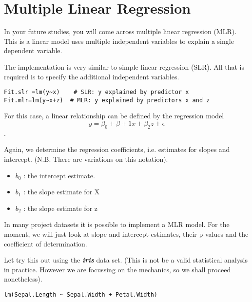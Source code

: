 \documentclass[a4paper,12pt]{article}
\begin{document}
\Large


\newpage
\section{Multiple Linear Regression}
In your future studies, you will come across multiple linear regression (MLR). This is a linear model uses multiple independent variables to explain a single dependent variable.

The implementation is very similar to simple linear regression (SLR). All that is required is to specify the additional independent variables.

\begin{framed}
\begin{verbatim}
Fit.slr =lm(y~x)  	# SLR: y explained by predictor x
Fit.mlr=lm(y~x+z)  # MLR: y explained by predictors x and z
\end{verbatim}
\end{framed}

For this case, a  linear relationship can be defined by the regression model  \[y =\beta_0 + \beta+1x + \beta_2z + \epsilon\].

Again, we determine the regression coefficients, i.e. estimates for slopes and intercept. (N.B. There are variations on this notation).

\begin{itemize}
\item	$b_0$ : the intercept estimate.
\item	$b_1$  : the slope estimate for X
\item	$b_2$  : the slope estimate for z
\end{itemize}

In many project datasets it is possible to implement a MLR model. For the moment, we will just look at slope and intercept estimates, their p-values and the coefficient of determination.

Let try this out using the \textbf{\textit{iris}} data set. (This is not be a valid statistical analysis in practice. However we are focussing on the mechanics, so we shall proceed nonetheless).
\begin{framed}
\begin{verbatim}
lm(Sepal.Length ~ Sepal.Width + Petal.Width)
\end{verbatim}
\end{framed}

\newpage
\end{document}
